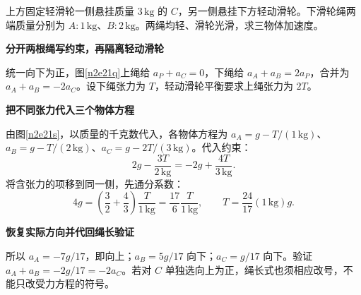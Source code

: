 \begin{question}\begin{example}[双层阿特伍德装置]\label{n2e21}
上方固定轻滑轮一侧悬挂质量 $3\,\mathrm{kg}$ 的 $C$，另一侧悬挂下方轻动滑轮。下滑轮绳两端质量分别为 $A:1\,\mathrm{kg}$、$B:2\,\mathrm{kg}$。两绳均轻、滑轮光滑，求三物体加速度。
\end{example}\end{question}
\begin{solution}\textbf{分开两根绳写约束，再隔离轻动滑轮}\par\nobreak
统一向下为正，图\ref{n2e21q}上绳给 $a_P+a_C=0$，下绳给 $a_A+a_B=2a_P$，合并为 $a_A+a_B=-2a_C$。设下绳张力为 $T$，轻动滑轮平衡要求上绳张力为 $2T$。


\par\medskip{}\noindent\textbf{把不同张力代入三个物体方程}\par\nobreak
由图\ref{n2e21s}，以质量的千克数代入，各物体方程为 $a_A=g-T/(1\,\mathrm{kg})$、$a_B=g-T/(2\,\mathrm{kg})$、$a_C=g-2T/(3\,\mathrm{kg})$。代入约束：
\[
 2g-\frac{3T}{2\,\mathrm{kg}}=-2g+\frac{4T}{3\,\mathrm{kg}}.
\]
将含张力的项移到同一侧，先通分系数：
\[
 4g=\left(\frac32+\frac43\right)\frac{T}{1\,\mathrm{kg}}
 =\frac{17}{6}\frac{T}{1\,\mathrm{kg}},
 \qquad T=\frac{24}{17}(1\,\mathrm{kg})g.
\]


\par\medskip{}\noindent\textbf{恢复实际方向并代回绳长验证}\par\nobreak
所以 $a_A=-7g/17$，即向上；$a_B=5g/17$ 向下；$a_C=g/17$ 向下。验证 $a_A+a_B=-2g/17=-2a_C$。若对 $C$ 单独选向上为正，绳长式也须相应改号，不能只改受力方程的符号。
\end{solution}

